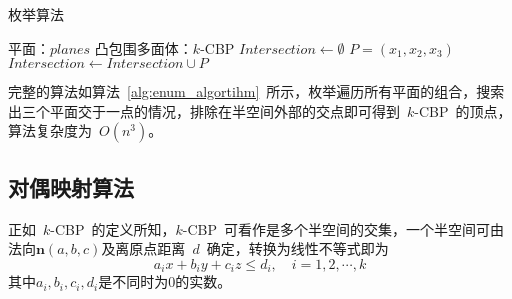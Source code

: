 \begin{algorithm}[htbp]
\small
\caption{枚举算法}
\label{alg:enum_algortihm}
\begin{algorithmic}[1]
\Require
平面：$planes$
\Ensure
凸包围多面体：$k$-CBP
    \State $Intersection \gets \emptyset $
                      \State $P = (x_1, x_2, x_3)$
                        \State {}
                        \State $Intersection \gets Intersection \cup P$
                      \EndIf
                  \EndIf
              \EndIf
          \EndFor
     \EndFor
     \EndIf
  \EndFor
  \State {}
\EndFunction
\end{algorithmic}
\end{algorithm}

完整的算法如算法~\ref{alg:enum_algortihm}~所示，枚举遍历所有平面的组合，搜索出三个平面交于一点的情况，排除在半空间外部的交点即可得到~$k$-CBP~的顶点，算法复杂度为~$O(n^3)$。

\subsection{对偶映射算法}
\label{subsec:intersection-dual-mapping}

正如~$k$-CBP~的定义所知，$k$-CBP~可看作是多个半空间的交集，一个半空间可由法向$\bm{n}(a,b,c)$及离原点距离~$d$~确定，转换为线性不等式即为
\begin{equation}
  \label{equa:halfspace:defition}
  a_ix+b_iy+c_iz \leq d_i, \quad i=1,2,\cdots,k
\end{equation}
其中$a_i,b_i,c_i,d_i$是不同时为0的实数。

